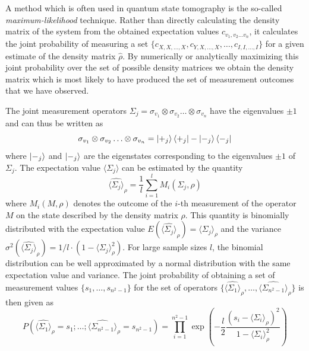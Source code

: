 A method which is often used in quantum state tomography is the so-called {\it maximum-likelihood} technique. Rather than directly calculating the density matrix of the system from the obtained expectation values $c_{v_1,v_2\hdots v_n}$, it calculates the joint probability of measuring a set $\{c_{X,X,\hdots,X},c_{Y,X,\hdots,X},\hdots,c_{I,I,\hdots,I}\}$ for a given estimate of the density matrix $\hat{\rho}$. By numerically or analytically maximizing this joint probability over the set of possible density matrices we obtain the density matrix which is most likely to have produced the set of measurement outcomes that we have observed.

The joint measurement operators $\Sigma_j = \sigma_{v_1}\otimes \sigma_{v_2}\hdots \otimes\sigma_{v_n}$ have the eigenvalues $\pm 1$ and can thus be written as 
\begin{equation}
\sigma_{v_1}\otimes \sigma_{v_2}\hdots \otimes\sigma_{v_n} = \left| +_j \right>\left< +_j \right|-\left| -_j \right>\left< -_j \right|
\end{equation}
where $\left| -_j \right>$ and $\left| -_j \right>$ are the eigenstates corresponding to the eigenvalues $\pm 1$ of $\Sigma_j$. The expectation value $\langle \Sigma_j \rangle$ can be estimated by the quantity
\begin{equation}
\widehat{\langle \Sigma_j \rangle}_\rho = \frac{1}{l}\sum\limits_{i = 1}^l M_i(\Sigma_j,\rho) \label{eq:tomography_measurement_estimator}
\end{equation}
 where $M_i(M,\rho)$ denotes the outcome of the $i$-th measurement of the operator $M$ on the state described by the density matrix $\rho$. This quantity is binomially distributed with the expectation value $E(\widehat{\langle \Sigma_j \rangle}_\rho) = \langle \Sigma_j \rangle_\rho$ and the variance $\sigma^2(\widehat{\langle \Sigma_j \rangle}_\rho) = 1/l \cdot (1-\langle \Sigma_j \rangle_\rho^2)$. For large sample sizes $l$, the binomial distribution can be well approximated by a normal distribution with the same expectation value and variance. The joint probability of obtaining a set of measurement values $\{s_1,\hdots,s_{n^2-1}\}$ for the set of operators $\{\widehat{\langle\Sigma_1 \rangle}_\rho,\hdots,\widehat{\langle\Sigma_{n^2-1} \rangle}_\rho\}$ is then given as
\begin{equation}
P\left(\widehat{\langle \Sigma_1 \rangle }_\rho = s_1;\hdots;\widehat{\langle \Sigma_{n^2-1} \rangle}_\rho =  s_{n^2-1}\right) = \prod\limits_{i = 1}^{n^2-1} \exp{\left(-\frac{l}{2}\frac{(s_i-\langle \Sigma_i \rangle_\rho)^2}{1-\langle \Sigma_i \rangle_\rho^2}\right)}
\end{equation}
